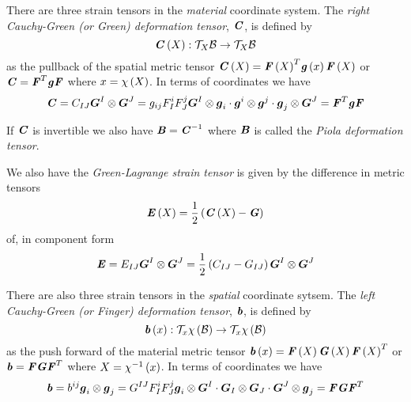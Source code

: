 There are three strain tensors in the \emph{material} coordinate system. The
\emph{right Cauchy-Green (or Green) deformation tensor}, $\tensor{C}$, is
defined by
\begin{equation}
  \mapping{\fnof{\tensor{C}}{X}}{\tangentspace{\embedmanifold{B}}{X}}{\tangentspace{\embedmanifold{B}}{X}}
\end{equation}
as the pullback of the spatial metric tensor \ie $\fnof{\tensor{C}}{X}=\transpose{\fnof{\tensor{F}}{X}}\fnof{\tensor{g}}{x}\fnof{\tensor{F}}{X}$
or $\tensor{C}=\transpose{\tensor{F}}\tensor{g}\tensor{F}$ where $x=\fnof{\chi}{X}$. In terms of coordinates we
have
\begin{equation}
  \tensor{C}=C_{IJ}\tensorprod{\vectr{G}^{I}}{\vectr{G}^{J}}=g_{ij}F^{i}_{I}F^{j}_{J}\dotprod{\dotprod{\tensorprod{\vectr{G}^{I}}{\vectr{g}_{i}}}{\tensorprod{\vectr{g}^{i}}{\vectr{g}^{j}}}}{\tensorprod{\vectr{g}_{j}}{\vectr{G}^{J}}}=\transpose{\tensor{F}}\tensor{g}\tensor{F}
\end{equation}

If $\tensor{C}$ is invertible we also have $\tensor{B}=\inverse{\tensor{C}}$
where $\tensor{B}$ is called the \emph{Piola deformation
  tensor}.

We also have the \emph{Green-Lagrange strain tensor} is given by the difference
in metric tensors
\begin{equation}
  \fnof{\tensor{E}}{X}=\frac{1}{2}\pbrac{\fnof{\tensor{C}}{X}-\tensor{G}}
\end{equation}
of, in component form
\begin{equation}
  \tensor{E}=E_{IJ}\tensorprod{\vectr{G}^{I}}{\vectr{G}^{J}}=\frac{1}{2}\pbrac{C_{IJ}-G_{IJ}}\tensorprod{\vectr{G}^{I}}{\vectr{G}^{J}}
\end{equation}

There are also three strain tensors in the \emph{spatial} coordinate
sytsem. The \emph{left Cauchy-Green (or Finger) deformation tensor},
$\tensor{b}$, is defined by
\begin{equation}
  \mapping{\fnof{\tensor{b}}{x}}{\tangentspace{\fnof{\chi}{\embedmanifold{B}}}{x}}{\tangentspace{\fnof{\chi}{\embedmanifold{B}}}{x}}
\end{equation}
as the push forward of the material metric tensor \ie
$\fnof{\tensor{b}}{x}=\fnof{\tensor{F}}{X}\fnof{\tensor{G}}{X}\transpose{\fnof{\tensor{F}}{X}}$
or $\tensor{b}=\tensor{F}\tensor{G}\transpose{\tensor{F}}$ where
$X=\fnof{\inverse{\chi}}{x}$. In terms of coordinates we have
\begin{equation}
  \tensor{b}=b^{ij}\tensorprod{\vectr{g}_{i}}{\vectr{g}_{j}}=G^{IJ}F^{i}_{I}F^{j}_{J}\dotprod{\dotprod{\tensorprod{\vectr{g}_{i}}{\vectr{G}^{I}}}{\tensorprod{\vectr{G}_{I}}{\vectr{G}_{J}}}}{\tensorprod{\vectr{G}^{J}}{\vectr{g}_{j}}}=\tensor{F}\tensor{G}\transpose{\tensor{F}}
\end{equation}

